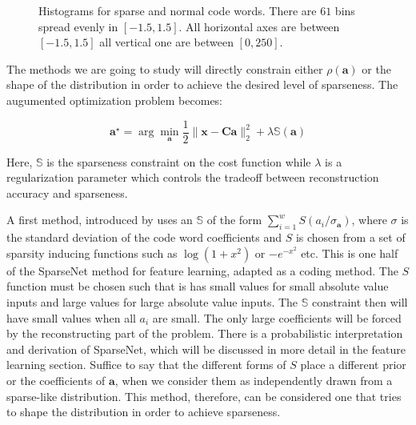 \documentclass[12pt,a4paper,oneside,english]{UPBThesis}
\begin{document}
\begin{figure}
\centering
{}
\caption{Histograms for sparse and normal code words. There are $61$ bins spread evenly in $[-1.5,1.5]$. All horizontal axes are between $[-1.5,1.5]$ all vertical one are between $[0,250]$.}
\label{fig:CodingMethodsCoeffHists}
\end{figure}

The methods we are going to study will directly constrain either $\rho(\textbf{a})$ or the shape of the distribution in order to achieve the desired level of sparseness. The augumented optimization problem becomes:

\begin{equation*}
\textbf{a}^{\star} = \arg\min_{\textbf{a}} \frac{1}{2} \| \textbf{x} - \textbf{C}\textbf{a} \|_2^2 + \lambda \mathbb{S}(\textbf{a})
\end{equation*}

Here, $\mathbb{S}$ is the sparseness constraint on the cost function while $\lambda$ is a regularization parameter which controls the tradeoff between reconstruction accuracy and sparseness.

A first method, introduced by \cite{emergence-sparse-coding} uses an $\mathbb{S}$ of the form $\sum_{i=1}^w{S(a_i / \sigma_{\textbf{a}})}$, where $\sigma$ is the standard deviation of the code word coefficients and $S$ is chosen from a set of sparsity inducing functions such as $\log(1 + x^2)$ or $-e^{-x^2}$ etc. This is one half of the SparseNet method for feature learning, adapted as a coding method. The $S$ function must be chosen such that is has small values for small absolute value inputs and large values for large absolute value inputs. The $\mathbb{S}$ constraint then will have small values when all $a_i$ are small. The only large coefficients will be forced by the reconstructing part of the problem. There is a probabilistic interpretation and derivation of SparseNet, which will be discussed in more detail in the feature learning section. Suffice to say that the different forms of $S$ place a different prior or the coefficients of $\textbf{a}$, when we consider them as independently drawn from a sparse-like distribution. This method, therefore, can be considered one that tries to shape the distribution in order to achieve sparseness.
\end{document}
